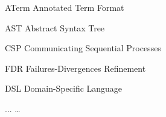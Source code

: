 \begin{siglas}
  \item[ATerm] Annotated Term Format
  \item[AST] Abstract Syntax Tree
  \item[CSP] Communicating Sequential Processes	
  \item[FDR] Failures-Divergences Refinement
  \item[DSL] Domain-Specific Language
  \item[...] \ldots
\end{siglas}